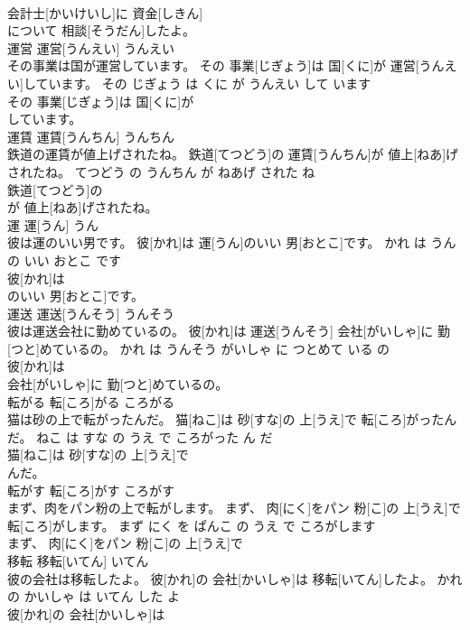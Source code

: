 \documentclass[8pt]{extreport}
\begin{document}
\begin{CJK}{UTF8}{min}
\\	会計士[かいけいし]に 資金[しきん]
\\	について 相談[そうだん]したよ。			
\\	運営	運営[うんえい]	うんえい	
\\	その事業は国が運営しています。	その 事業[じぎょう]は 国[くに]が 運営[うんえい]しています。	その じぎょう は くに が うんえい して います	
\\	その 事業[じぎょう]は 国[くに]が
\\	しています。			
\\	運賃	運賃[うんちん]	うんちん	
\\	鉄道の運賃が値上げされたね。	鉄道[てつどう]の 運賃[うんちん]が 値上[ねあ]げされたね。	てつどう の うんちん が ねあげ された ね	
\\	鉄道[てつどう]の
\\	が 値上[ねあ]げされたね。			
\\	運	運[うん]	うん	
\\	彼は運のいい男です。	彼[かれ]は 運[うん]のいい 男[おとこ]です。	かれ は うん の いい おとこ です	
\\	彼[かれ]は
\\	のいい 男[おとこ]です。			
\\	運送	運送[うんそう]	うんそう	
\\	彼は運送会社に勤めているの。	彼[かれ]は 運送[うんそう] 会社[がいしゃ]に 勤[つと]めているの。	かれ は うんそう がいしゃ に つとめて いる の	
\\	彼[かれ]は
\\	会社[がいしゃ]に 勤[つと]めているの。			
\\	転がる	転[ころ]がる	ころがる	
\\	猫は砂の上で転がったんだ。	猫[ねこ]は 砂[すな]の 上[うえ]で 転[ころ]がったんだ。	ねこ は すな の うえ で ころがった ん だ	
\\	猫[ねこ]は 砂[すな]の 上[うえ]で
\\	んだ。			
\\	転がす	転[ころ]がす	ころがす	
\\	まず、肉をパン粉の上で転がします。	まず、 肉[にく]をパン 粉[こ]の 上[うえ]で 転[ころ]がします。	まず にく を ぱんこ の うえ で ころがします	
\\	まず、 肉[にく]をパン 粉[こ]の 上[うえ]で
\\	移転	移転[いてん]	いてん	
\\	彼の会社は移転したよ。	彼[かれ]の 会社[かいしゃ]は 移転[いてん]したよ。	かれ の かいしゃ は いてん した よ	
\\	彼[かれ]の 会社[かいしゃ]は

\end{CJK}
\end{document}
